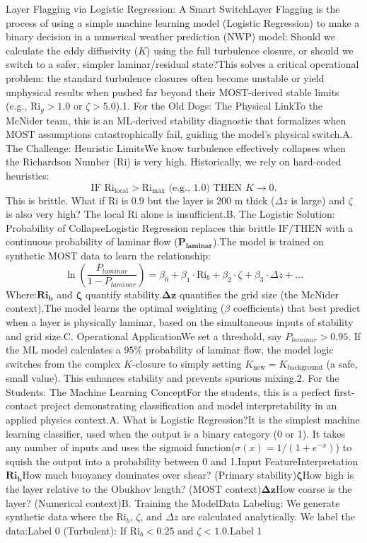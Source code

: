 Layer Flagging via Logistic Regression: A Smart SwitchLayer Flagging is the process of using a simple machine learning model (Logistic Regression) to make a binary decision in a numerical weather prediction ($\text{NWP}$) model: Should we calculate the eddy diffusivity ($K$) using the full turbulence closure, or should we switch to a safer, simpler laminar/residual state?This solves a critical operational problem: the standard turbulence closures often become unstable or yield unphysical results when pushed far beyond their $\text{MOST}$-derived stable limits (e.g., $\text{Ri}_g > 1.0$ or $\zeta > 5.0$).1. For the Old Dogs: The Physical LinkTo the $\text{McNider}$ team, this is an ML-derived stability diagnostic that formalizes when $\text{MOST}$ assumptions catastrophically fail, guiding the model's physical switch.A. The Challenge: Heuristic LimitsWe know turbulence effectively collapses when the $\text{Richardson Number}$ ($\text{Ri}$) is very high. Historically, we rely on hard-coded heuristics:$$\text{IF } \text{Ri}_{\text{local}} > \text{Ri}_{\max} \text{ (e.g., } 1.0) \text{ THEN } K \to 0.$$This is brittle. What if $\text{Ri}$ is $0.9$ but the layer is $200 \text{ m}$ thick ($\Delta z$ is large) and $\zeta$ is also very high? The local $\text{Ri}$ alone is insufficient.B. The Logistic Solution: Probability of CollapseLogistic Regression replaces this brittle $\text{IF/THEN}$ with a continuous probability of laminar flow ($\mathbf{P_{laminar}}$).The model is trained on synthetic $\text{MOST}$ data to learn the relationship:$$\ln\left(\frac{P_{laminar}}{1 - P_{laminar}}\right) = \beta_0 + \beta_1 \cdot \text{Ri}_b + \beta_2 \cdot \zeta + \beta_3 \cdot \Delta z + \dots$$Where:$\mathbf{\text{Ri}_b}$ and $\mathbf{\zeta}$ quantify stability.$\mathbf{\Delta z}$ quantifies the grid size (the $\text{McNider}$ context).The model learns the optimal weighting ($\beta$ coefficients) that best predict when a layer is physically laminar, based on the simultaneous inputs of stability and grid size.C. Operational ApplicationWe set a threshold, say $P_{laminar} > 0.95$. If the $\text{ML}$ model calculates a $95\%$ probability of laminar flow, the model logic switches from the complex $K$-closure to simply setting $K_{\text{new}} = K_{\text{background}}$ (a safe, small value). This enhances stability and prevents spurious mixing.2. For the Students: The Machine Learning ConceptFor the students, this is a perfect first-contact project demonstrating classification and model interpretability in an applied physics context.A. What is Logistic Regression?It is the simplest machine learning classifier, used when the output is a binary category (0 or 1). It takes any number of inputs and uses the sigmoid function($\sigma(x) = 1/(1+e^{-x})$) to squish the output into a probability between 0 and 1.Input FeatureInterpretation$\mathbf{\text{Ri}_b}$How much buoyancy dominates over shear? (Primary stability)$\mathbf{\zeta}$How high is the layer relative to the $\text{Obukhov}$ length? (MOST context)$\mathbf{\Delta z}$How coarse is the layer? (Numerical context)B. Training the ModelData Labeling: We generate synthetic data where the $\text{Ri}_b$, $\zeta$, and $\Delta z$ are calculated analytically. We label the data:Label 0 (Turbulent): If $\text{Ri}_b < 0.25$ and $\zeta < 1.0$.Label 1 